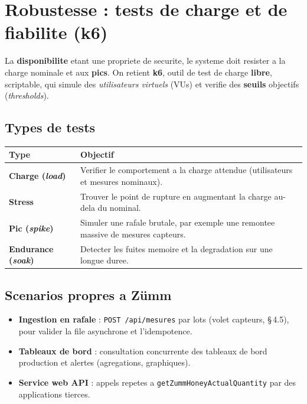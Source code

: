 \section{Robustesse : tests de charge et de fiabilite (k6)}
La \textbf{disponibilite} etant une propriete de securite, le systeme doit
resister a la charge nominale et aux \textbf{pics}. On retient \textbf{k6}, outil
de test de charge \textbf{libre}, scriptable, qui simule des \emph{utilisateurs
virtuels} (VUs) et verifie des \textbf{seuils} objectifs (\emph{thresholds}).

\subsection{Types de tests}
\begin{xltabular}{\textwidth}{>{\bfseries}p{3cm} X}
\toprule
\textbf{Type} & \textbf{Objectif} \\
\midrule
\endhead
Charge (\emph{load}) & Verifier le comportement a la charge attendue (utilisateurs et mesures nominaux). \\
Stress & Trouver le point de rupture en augmentant la charge au-dela du nominal. \\
Pic (\emph{spike}) & Simuler une rafale brutale, par exemple une remontee massive de mesures capteurs. \\
Endurance (\emph{soak}) & Detecter les fuites memoire et la degradation sur une longue duree. \\
\bottomrule
\end{xltabular}

\subsection{Scenarios propres a Z\"umm}
\begin{itemize}
  \item \textbf{Ingestion en rafale} : \texttt{POST /api/mesures} par lots
        (volet capteurs, §\,4.5), pour valider la file asynchrone et l'idempotence.
  \item \textbf{Tableaux de bord} : consultation concurrente des tableaux de bord
        production et alertes (agregations, graphiques).
  \item \textbf{Service web API} : appels repetes a
        \texttt{getZummHoneyActualQuantity} par des applications tierces.
\end{itemize}


